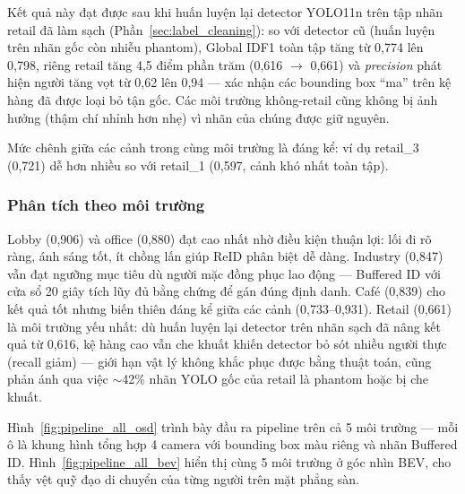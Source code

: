 \documentclass{article} %
\begin{document}
Kết quả này đạt được sau khi huấn luyện lại detector YOLO11n trên tập nhãn retail đã làm sạch (Phần~\ref{sec:label_cleaning}): so với detector cũ (huấn luyện trên nhãn gốc còn nhiễu phantom), Global IDF1 toàn tập tăng từ 0,774 lên 0,798, riêng retail tăng 4,5 điểm phần trăm (0,616 $\to$ 0,661) và \textit{precision} phát hiện người tăng vọt từ 0,62 lên 0,94 --- xác nhận các bounding box ``ma'' trên kệ hàng đã được loại bỏ tận gốc. Các môi trường không-retail cũng không bị ảnh hưởng (thậm chí nhỉnh hơn nhẹ) vì nhãn của chúng được giữ nguyên.

Mức chênh giữa các cảnh trong cùng môi trường là đáng kể: ví dụ retail\_3 (0,721) dễ hơn nhiều so với retail\_1 (0,597, cảnh khó nhất toàn tập).

\subsubsection{Phân tích theo môi trường}

Lobby (0,906) và office (0,880) đạt cao nhất nhờ điều kiện thuận lợi: lối đi rõ ràng, ánh sáng tốt, ít chồng lấn giúp ReID phân biệt dễ dàng. Industry (0,847) vẫn đạt ngưỡng mục tiêu dù người mặc đồng phục lao động --- Buffered ID với cửa sổ 20 giây tích lũy đủ bằng chứng để gán đúng định danh. Café (0,839) cho kết quả tốt nhưng biến thiên đáng kể giữa các cảnh (0,733--0,931). Retail (0,661) là môi trường yếu nhất: dù huấn luyện lại detector trên nhãn sạch đã nâng kết quả từ 0,616, kệ hàng cao vẫn che khuất khiến detector bỏ sót nhiều người thực (recall giảm) --- giới hạn vật lý không khắc phục được bằng thuật toán, cũng phản ánh qua việc $\sim$42\% nhãn YOLO gốc của retail là phantom hoặc bị che khuất.

Hình~\ref{fig:pipeline_all_osd} trình bày đầu ra pipeline trên cả 5 môi trường --- mỗi ô là khung hình tổng hợp 4 camera với bounding box màu riêng và nhãn Buffered ID. Hình~\ref{fig:pipeline_all_bev} hiển thị cùng 5 môi trường ở góc nhìn BEV, cho thấy vệt quỹ đạo di chuyển của từng người trên mặt phẳng sàn.
\end{document}
